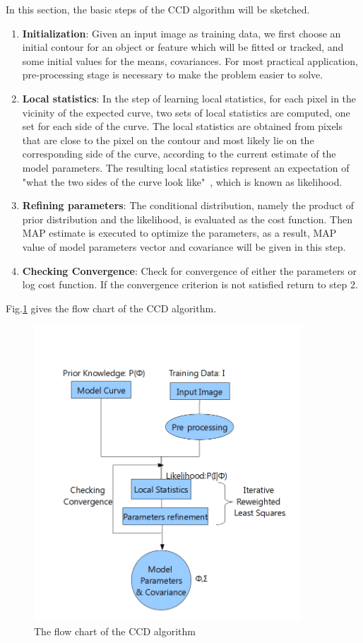 In this section, the basic steps of the CCD algorithm will be
sketched. 
\begin{enumerate}
\item \textbf{Initialization}: Given an input image as training data, we first choose an initial
contour for an object or feature which will be fitted or tracked, and
some initial values for the means, covariances. For most practical
application, pre-processing stage is necessary to make the problem
easier to solve. 
\item \textbf{Local statistics}: In the step of learning local
  statistics, for each pixel in the
vicinity of the expected curve, two sets of local statistics
are computed, one set for each side of the curve. The local statistics are obtained from
pixels that are close to the pixel on the contour and most likely lie
on the corresponding side of the curve, according to the current
estimate of the model parameters. The resulting local statistics
represent an expectation of "what the two sides of the curve look
like"~\cite{hanek2004contracting}, which is known as likelihood.
\item \textbf{Refining parameters}: The conditional distribution, namely
  the product of prior distribution and  the likelihood, is evaluated
  as the cost function. Then MAP estimate is executed to optimize the
  parameters, as a result, MAP value of model parameters vector and
  covariance will be given in this step.
\item \textbf{Checking Convergence}: Check for convergence of either
  the parameters or log cost function. If the convergence criterion is
  not satisfied return to step 2.
\end{enumerate}
Fig.\ref{fig:flowchart} gives the flow chart of the CCD algorithm.
\begin{figure}[htb]
  \centering
  \includegraphics[width=10cm]{images/flowchart.png}
  \caption[The flow chart of
  the CCD algorithm ]{The flow chart of the CCD algorithm}
  \label{fig:flowchart}
\end{figure}


